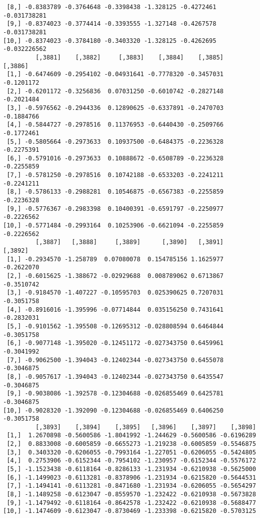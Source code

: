 \documentclass[
  letterpaper,
  DIV=11,
  numbers=noendperiod]{scrreprt}
\begin{document}
\begin{verbatim}
 [8,] -0.8383789 -0.3764648 -0.3398438 -1.328125 -0.4272461 -0.031738281
 [9,] -0.8374023 -0.3774414 -0.3393555 -1.327148 -0.4267578 -0.031738281
[10,] -0.8374023 -0.3784180 -0.3403320 -1.328125 -0.4262695 -0.032226562
         [,3881]    [,3882]     [,3883]    [,3884]    [,3885]    [,3886]
 [1,] -0.6474609 -0.2954102 -0.04931641 -0.7778320 -0.3457031 -0.1201172
 [2,] -0.6201172 -0.3256836  0.07031250 -0.6010742 -0.2827148 -0.2021484
 [3,] -0.5976562 -0.2944336  0.12890625 -0.6337891 -0.2470703 -0.1884766
 [4,] -0.5844727 -0.2978516  0.11376953 -0.6440430 -0.2509766 -0.1772461
 [5,] -0.5805664 -0.2973633  0.10937500 -0.6484375 -0.2236328 -0.2275391
 [6,] -0.5791016 -0.2973633  0.10888672 -0.6508789 -0.2236328 -0.2255859
 [7,] -0.5781250 -0.2978516  0.10742188 -0.6533203 -0.2241211 -0.2241211
 [8,] -0.5786133 -0.2988281  0.10546875 -0.6567383 -0.2255859 -0.2236328
 [9,] -0.5776367 -0.2983398  0.10400391 -0.6591797 -0.2250977 -0.2226562
[10,] -0.5771484 -0.2993164  0.10253906 -0.6621094 -0.2255859 -0.2226562
         [,3887]   [,3888]     [,3889]      [,3890]   [,3891]    [,3892]
 [1,] -0.2934570 -1.258789  0.07080078  0.154785156 1.1625977 -0.2622070
 [2,] -0.6015625 -1.388672 -0.02929688  0.008789062 0.6713867 -0.3510742
 [3,] -0.9184570 -1.407227 -0.10595703  0.025390625 0.7207031 -0.3051758
 [4,] -0.8916016 -1.395996 -0.07714844  0.035156250 0.7431641 -0.2832031
 [5,] -0.9101562 -1.395508 -0.12695312 -0.028808594 0.6464844 -0.3051758
 [6,] -0.9077148 -1.395020 -0.12451172 -0.027343750 0.6459961 -0.3041992
 [7,] -0.9062500 -1.394043 -0.12402344 -0.027343750 0.6455078 -0.3046875
 [8,] -0.9057617 -1.394043 -0.12402344 -0.027343750 0.6435547 -0.3046875
 [9,] -0.9038086 -1.392578 -0.12304688 -0.026855469 0.6425781 -0.3046875
[10,] -0.9028320 -1.392090 -0.12304688 -0.026855469 0.6406250 -0.3051758
         [,3893]    [,3894]    [,3895]   [,3896]    [,3897]    [,3898]
 [1,]  1.2670898 -0.5600586 -1.8041992 -1.244629 -0.5600586 -0.6196289
 [2,]  0.8833008 -0.6005859 -0.6655273 -1.219238 -0.6005859 -0.5546875
 [3,]  0.3403320 -0.6206055 -0.7993164 -1.227051 -0.6206055 -0.5424805
 [4,]  0.2753906 -0.6152344 -0.7954102 -1.230957 -0.6152344 -0.5576172
 [5,] -1.1523438 -0.6118164 -0.8286133 -1.231934 -0.6210938 -0.5625000
 [6,] -1.1499023 -0.6113281 -0.8378906 -1.231934 -0.6215820 -0.5644531
 [7,] -1.1494141 -0.6113281 -0.8471680 -1.231934 -0.6206055 -0.5654297
 [8,] -1.1489258 -0.6123047 -0.8559570 -1.232422 -0.6210938 -0.5673828
 [9,] -1.1479492 -0.6118164 -0.8642578 -1.232422 -0.6210938 -0.5688477
[10,] -1.1474609 -0.6123047 -0.8730469 -1.233398 -0.6215820 -0.5703125

\end{verbatim}
\end{document}
